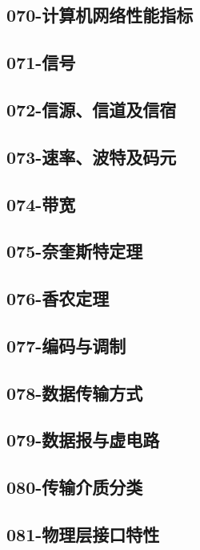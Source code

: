 \subsection{070-计算机网络性能指标}

\subsection{071-信号}

\subsection{072-信源、信道及信宿}

\subsection{073-速率、波特及码元}

\subsection{074-带宽}

\subsection{075-奈奎斯特定理}

\subsection{076-香农定理}

\subsection{077-编码与调制}

\subsection{078-数据传输方式}

\subsection{079-数据报与虚电路}

\subsection{080-传输介质分类}

\subsection{081-物理层接口特性}

